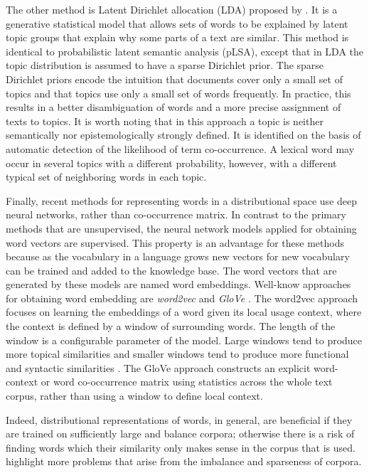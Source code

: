 The other method is Latent Dirichlet allocation (LDA) proposed by . 
It is a generative statistical model that allows sets of words to be explained by latent topic groups that explain why some parts of a text are similar. 
This method is identical to probabilistic latent semantic analysis (pLSA), except that in LDA the topic distribution is assumed to have a sparse Dirichlet prior.
The sparse Dirichlet priors encode the intuition that documents cover only a small set of topics and that topics use only a small set of words frequently. 
In practice, this results in a better disambiguation of words and a more precise assignment of texts to topics.
It is worth noting that in this approach a topic is neither semantically nor epistemologically strongly defined. 
It is identified on the basis of automatic detection of the likelihood of term co-occurrence. 
A lexical word may occur in several topics with a different probability, however, with a different typical set of neighboring words in each topic.

Finally, recent methods for representing words in a distributional space use deep neural networks, rather than co-occurrence matrix. 
In contrast to the primary methods that are unsupervised, the neural network models applied for obtaining word vectors are supervised.  
This property is an advantage for these methods because as the vocabulary in a language grows new vectors for new vocabulary can be trained and added to the knowledge base. 
The word vectors that are generated by these models are named word embeddings. 
Well-know approaches for obtaining word embedding are \emph{word2vec}  \cite{mikolov13} and \emph{GloVe} \cite{pennington14}. 
The word2vec approach focuses on learning the embeddings of a word given its local usage context, where the context is defined by a window of surrounding words. 
The length of the window is a configurable parameter of the model. 
Large windows tend to produce more topical similarities and smaller windows tend to produce more functional and syntactic similarities \cite{goldberg17}. 
The GloVe approach constructs an explicit word-context or word co-occurrence matrix using statistics across the whole text corpus, rather than using a window to define local context. 

Indeed, distributional representations of words, in general, are beneficial if they are trained on sufficiently large and balance corpora; otherwise there is a risk \cite{lindekang98b} of finding words which their similarity only makes sense in the corpus that is used. 
 highlight more problems that arise from the imbalance and sparseness of corpora.

